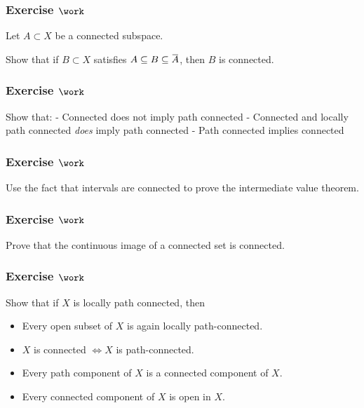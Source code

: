 \hypertarget{exercise-work-6}{%
\subsubsection{\texorpdfstring{Exercise
\(\work\)}{Exercise \textbackslash work}}\label{exercise-work-6}}

Let \(A \subset X\) be a connected subspace.

Show that if \(B\subset X\) satisfies
\(A\subseteq B \subseteq \mkern 1.5mu\overline{\mkern-1.5muA\mkern-1.5mu}\mkern 1.5mu\),
then \(B\) is connected.

\hypertarget{exercise-work-7}{%
\subsubsection{\texorpdfstring{Exercise
\(\work\)}{Exercise \textbackslash work}}\label{exercise-work-7}}

Show that: - Connected does not imply path connected - Connected and
locally path connected \emph{does} imply path connected - Path connected
implies connected

\hypertarget{exercise-work-8}{%
\subsubsection{\texorpdfstring{Exercise
\(\work\)}{Exercise \textbackslash work}}\label{exercise-work-8}}

Use the fact that intervals are connected to prove the intermediate
value theorem.

\hypertarget{exercise-work-9}{%
\subsubsection{\texorpdfstring{Exercise
\(\work\)}{Exercise \textbackslash work}}\label{exercise-work-9}}

Prove that the continuous image of a connected set is connected.

\hypertarget{exercise-work-10}{%
\subsubsection{\texorpdfstring{Exercise
\(\work\)}{Exercise \textbackslash work}}\label{exercise-work-10}}

Show that if \(X\) is locally path connected, then

\begin{itemize}
\tightlist
\item
  Every open subset of \(X\) is again locally path-connected.
\item
  \(X\) is connected \(\iff X\) is path-connected.
\item
  Every path component of \(X\) is a connected component of \(X\).
\item
  Every connected component of \(X\) is open in \(X\).
\end{itemize}

